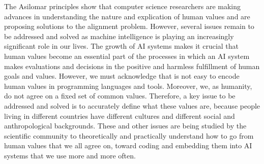 The Asilomar principles show that computer science researchers are making advances in understanding the nature and explication of human values and are proposing solutions to the alignment problem. However, several issues remain to be addressed and solved as machine intelligence is playing an increasingly significant role in our lives. The growth of AI systems makes it crucial that human values become an essential part of the processes in which an AI system makes evaluations and decisions in the positive and harmless fulfillment of human goals and values. However, we must acknowledge that is not easy to encode human values in programming languages and tools. Moreover, we, as humanity, do not agree on a fixed set of common values. Therefore, a key issue to be addressed and solved is to accurately define what these values are, because people living in different countries have different cultures and different social and anthropological backgrounds. These and other issues are being studied by the scientific community to theoretically and practically understand how to go from human values that we all agree on, toward coding and embedding them into AI systems that we use more and more often.

